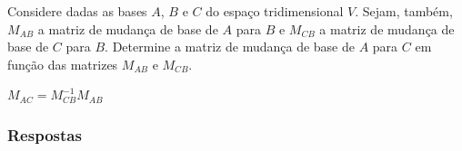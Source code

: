 \begin{exer}
  Considere dadas as bases $A$, $B$ e $C$ do espaço tridimensional $V$. Sejam, também, $M_{AB}$ a matriz de mudança de base de $A$ para $B$ e $M_{CB}$ a matriz de mudança de base de $C$ para $B$. Determine a matriz de mudança de base de $A$ para $C$ em função das matrizes $M_{AB}$ e $M_{CB}$.  
\end{exer}
\begin{resp}
  $M_{AC}=M_{CB}^{-1}M_{AB}$
\end{resp}

\ifisbook
\subsubsection{Respostas}
\shipoutAnswer
\fi
